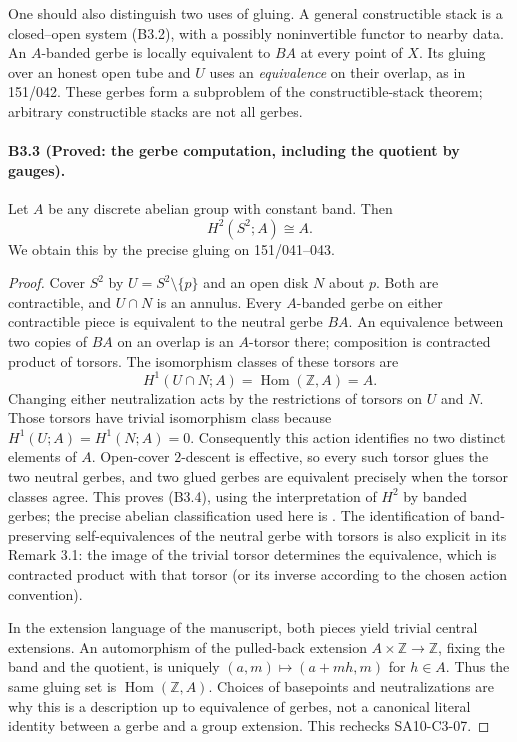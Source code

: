 One should also distinguish two uses of gluing. A general constructible
stack is a closed--open system (B3.2), with a possibly noninvertible
functor to nearby data. An $A$-banded gerbe is locally equivalent to
$BA$ at every point of $X$. Its gluing over an honest open tube and
$U$ uses an \emph{equivalence} on their overlap, as in 151/042.
These gerbes form a subproblem of the constructible-stack theorem;
arbitrary constructible stacks are not all gerbes.

\paragraph{B3.3 (Proved: the gerbe computation, including the quotient by gauges).}
Let $A$ be any discrete abelian group with constant band. Then
\[
 H^2(S^2;A)\cong A.
 \tag{B3.4}
\]
We obtain this by the precise gluing on 151/041--043.

\begin{proof}
Cover $S^2$ by $U=S^2\setminus\{p\}$ and an open disk $N$ about $p$.
Both are contractible, and $U\cap N$ is an annulus. Every $A$-banded
gerbe on either contractible piece is equivalent to the neutral
gerbe $BA$. An equivalence between two copies of $BA$ on an overlap
is an $A$-torsor there; composition is contracted product of torsors.
The isomorphism classes of these torsors are
\[
 H^1(U\cap N;A)=\operatorname{Hom}(\mathbb Z,A)=A.
\]
Changing either neutralization acts by the restrictions of torsors
on $U$ and $N$. Those torsors have trivial isomorphism class because
$H^1(U;A)=H^1(N;A)=0$. Consequently this action identifies no two
distinct elements of $A$. Open-cover $2$-descent is effective, so
every such torsor glues the two neutral gerbes, and two glued gerbes
are equivalent precisely when the torsor classes agree. This proves
(B3.4), using the interpretation of $H^2$ by banded gerbes; the
precise abelian classification used here is
\cite[Theorem 2.7]{DeopurkarGerbes}. The identification of
band-preserving self-equivalences of the neutral gerbe with torsors
is also explicit in its Remark 3.1: the image of the trivial torsor
determines the equivalence, which is contracted product with that
torsor (or its inverse according to the chosen action convention).

In the extension language of the manuscript, both pieces yield
trivial central extensions. An automorphism of the pulled-back
extension $A\times\mathbb Z\to\mathbb Z$, fixing the band and the
quotient, is uniquely $(a,m)\mapsto(a+mh,m)$ for $h\in A$.
Thus the same gluing set is $\operatorname{Hom}(\mathbb Z,A)$.
Choices of basepoints and neutralizations are why this is a
description up to equivalence of gerbes, not a canonical literal
identity between a gerbe and a group extension. This rechecks
SA10-C3-07.
\end{proof}


